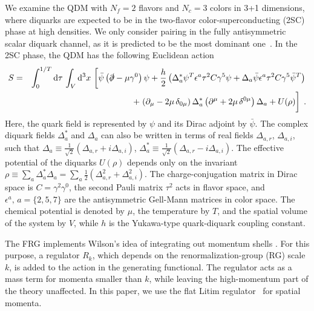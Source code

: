 \documentclass[
onecolumn,
aps,
prd,
amsmath,
amssymb,
nofootinbib
]{revtex4-2}
\begin{document}
We examine the QDM with $N_f = 2$ flavors and $N_c = 3$ colors in 3+1 dimensions, where diquarks are expected to be in the two-flavor color-superconducting (2SC) phase at high densities. 
We only consider pairing in the fully antisymmetric scalar diquark channel, as it is predicted to be the most dominant one~\cite{buballa2005njl}. 
In the 2SC phase, the QDM has the following Euclidean action~\cite{Shu2009wENO}
\begin{eqnarray}
	S &= & \int_0^{1/T}\mathrm{d} \tau\,\int_V \mathrm{d}^3x\,\left[\bar{\psi}\left(\slashed{\partial} - \mu \gamma^0\right)\psi + \frac{h}{2}\left(\Delta^*_a\psi^T\epsilon^a\tau^2C\gamma^5\psi+\Delta_a\bar{ \psi}\epsilon^a\tau^2C\gamma^5\bar{\psi}^T\right)\right.\nonumber\\
&&	\hspace*{2.5cm} +  \left.\left(\partial_\mu-2\mu\,\delta_{0\mu}\right)\Delta_a^*\left(\partial^\mu+2\mu\,\delta^{0\mu}\right)\Delta_a + U(\rho)\vphantom{\frac{h}{2}}\right]\;.\label{eq:Lagrangian}
\end{eqnarray}
Here, the quark field is represented by $\psi$ and its Dirac adjoint by $\bar{\psi}$.
The complex diquark fields  $\Delta_a^*$ and $\Delta_a$ can also be written in terms of real fields 
$\Delta_{a,r}$, $\Delta_{a,i}$, such that $\Delta_a  \equiv \frac{1}{\sqrt{2}}(\Delta_{a,r} + i\Delta_{a,i})$, $\Delta_a^* \equiv \frac{1}{\sqrt{2}}(\Delta_{a,r} - i \Delta_{a,i})$. 
The effective potential of the diquarks $U(\rho)$ depends only on the invariant $\rho \equiv \sum\limits_{a}\Delta^*_a\Delta_a = \sum\limits_{a}\frac{1}{2}(\Delta_{a,r}^2+\Delta_{a,i}^2)$. 
The charge-conjugation matrix in Dirac space is $C = \gamma^2\gamma^0$, the second Pauli matrix $\tau^2$ acts in flavor space, and $\epsilon^a,\, a = \{2,5,7\}$ are the antisymmetric Gell-Mann matrices in color space. 
The chemical potential is denoted by $\mu$, the temperature by $T$, and the spatial volume of the system by $V$, while $h$ is the Yukawa-type quark-diquark coupling constant. 

The FRG implements Wilson's idea of integrating out momentum shells   \cite{PhysRevB.4.3174}. 
For this purpose, a regulator $R_k$, which depends on the renormalization-group (RG) scale $k$, is added to the action in the generating functional. 
The regulator acts as a mass term for momenta smaller than $k$, while leaving the high-momentum part of the theory unaffected. 
In this paper, we use the flat Litim regulator~\cite{Litim:2001up} for spatial momenta.
\end{document}
